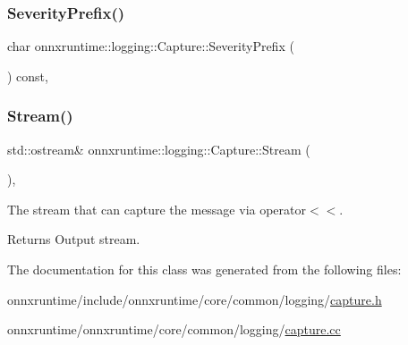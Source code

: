 \mbox{\label{classonnxruntime_1_1logging_1_1Capture_ad13001a74ade433dc8f529b4f898e097}} 
\subsubsection{\texorpdfstring{Severity\+Prefix()}{SeverityPrefix()}}
{\footnotesize\ttfamily char onnxruntime\+::logging\+::\+Capture\+::\+Severity\+Prefix (\begin{DoxyParamCaption}{ }\end{DoxyParamCaption}) const\hspace{0.3cm}{\ttfamily [inline]}, {\ttfamily [noexcept]}}

\mbox{\label{classonnxruntime_1_1logging_1_1Capture_aff0e9dfa2a1791e6e0b9058207bd64a6}} 
\subsubsection{\texorpdfstring{Stream()}{Stream()}}
{\footnotesize\ttfamily std\+::ostream\& onnxruntime\+::logging\+::\+Capture\+::\+Stream (\begin{DoxyParamCaption}{ }\end{DoxyParamCaption})\hspace{0.3cm}{\ttfamily [inline]}, {\ttfamily [noexcept]}}

The stream that can capture the message via operator$<$$<$. \begin{DoxyReturn}{Returns}
Output stream. 
\end{DoxyReturn}


The documentation for this class was generated from the following files\+:\begin{DoxyCompactItemize}
\item 
onnxruntime/include/onnxruntime/core/common/logging/\mbox{\hyperlink{capture_8h}{capture.\+h}}\item 
onnxruntime/onnxruntime/core/common/logging/\mbox{\hyperlink{capture_8cc}{capture.\+cc}}\end{DoxyCompactItemize}
